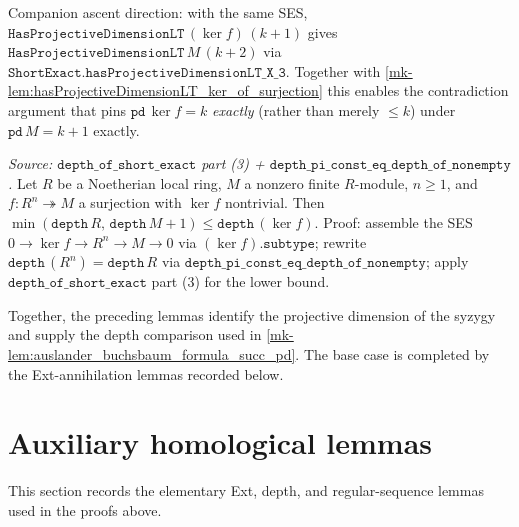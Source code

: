 \begin{lemma}\label{mk-lem:hasProjectiveDimensionLT_succ_of_hasProjectiveDimensionLT_ker}
  \leanok

  Companion ascent direction: with the same SES,
  \(\texttt{HasProjectiveDimensionLT}\,(\ker f)\,(k+1)\) gives
  \(\texttt{HasProjectiveDimensionLT}\,M\,(k+2)\) via
  \(\texttt{ShortExact.hasProjectiveDimensionLT\_X\_3}\). Together with
  \ref{mk-lem:hasProjectiveDimensionLT_ker_of_surjection} this enables the
  contradiction argument that pins \(\texttt{pd}\,\ker f = k\)
  \emph{exactly} (rather than merely \(\leq k\)) under
  \(\texttt{pd}\,M = k+1\) exactly.
\end{lemma}
\begin{lemma}
  \label{mk-lem:depth_ker_ge_min_of_surjection_finite_localRing}
  \textit{Source: \(\texttt{depth\_of\_short\_exact}\) part (3) +
  \(\texttt{depth\_pi\_const\_eq\_depth\_of\_nonempty}\).}
  Let \(R\) be a Noetherian local ring, \(M\) a nonzero finite
  \(R\)-module, \(n \geq 1\), and \(f : R^n \twoheadrightarrow M\) a
  surjection with \(\ker f\) nontrivial. Then
  \(\min(\texttt{depth}\,R,\, \texttt{depth}\,M + 1) \leq
   \texttt{depth}\,(\ker f)\).
  Proof: assemble the SES \(0 \to \ker f \to R^n \to M \to 0\) via
  \((\ker f).\texttt{subtype}\); rewrite
  \(\texttt{depth}\,(R^n) = \texttt{depth}\,R\) via
  \(\texttt{depth\_pi\_const\_eq\_depth\_of\_nonempty}\); apply
  \(\texttt{depth\_of\_short\_exact}\) part (3) for the lower bound.
\end{lemma}

Together, the preceding lemmas identify the projective dimension of the
syzygy and supply the depth comparison used in
\ref{mk-lem:auslander_buchsbaum_formula_succ_pd}. The base case is completed
by the Ext-annihilation lemmas recorded below.
\section{Auxiliary homological lemmas}
\label{mk-sec:ab_substrate_helpers}

This section records the elementary Ext, depth, and regular-sequence lemmas
used in the proofs above.

